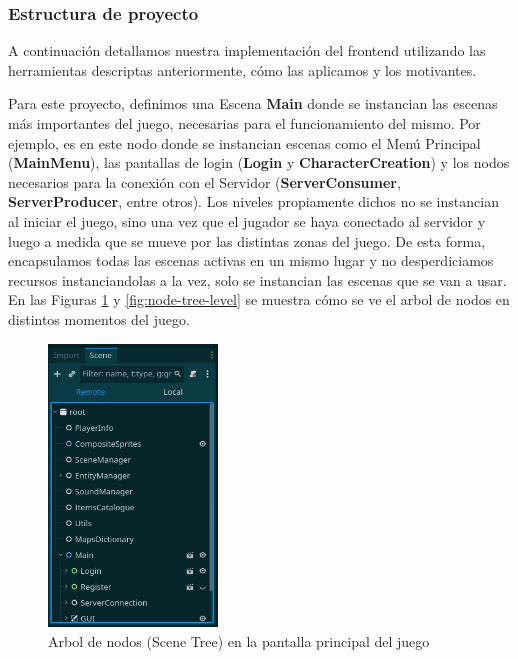 \subsubsection{Estructura de proyecto}

\noindent A continuación detallamos nuestra implementación del frontend utilizando las herramientas descriptas
anteriormente, cómo las aplicamos y los motivantes.

Para este proyecto, definimos una Escena \textbf{Main} donde se instancian las escenas más importantes 
del juego, necesarias para el funcionamiento del mismo. Por ejemplo, es en este nodo donde se instancian
escenas como el Menú Principal (\textbf{MainMenu}), las pantallas de login (\textbf{Login} y \textbf{CharacterCreation}) y los nodos necesarios para la conexión 
con el Servidor (\textbf{ServerConsumer}, \textbf{ServerProducer}, entre otros).
Los niveles propiamente dichos no se instancian al iniciar el juego, sino una vez que el jugador 
se haya conectado al servidor y luego a medida que se mueve por las distintas zonas del juego.
De esta forma, encapsulamos todas las escenas activas en un mismo lugar y 
no desperdiciamos recursos instanciandolas a la vez, solo se instancian las escenas que
se van a usar. En las Figuras \ref{fig:node-tree-main-menu} y \ref{fig:node-tree-level} se muestra
cómo se ve el arbol de nodos en distintos momentos del juego.

\begin{figure}[htbp]
    \centering
    \includegraphics[width=0.4\textwidth]{../assets/godot-scene-tree-1.png}
    \caption{Arbol de nodos (Scene Tree) en la pantalla principal del juego}
    \label{fig:node-tree-main-menu}
\end{figure}

